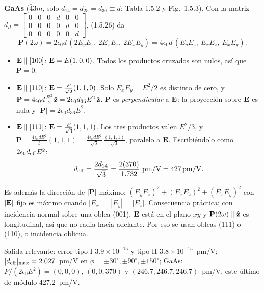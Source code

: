  \textbf{GaAs} ($\bar43m$, solo $d_{14}=d_{25}=d_{36}\equiv d$; Tabla 1.5.2 y Fig.~1.5.3). Con la matriz
$d_{il}=\left[\begin{smallmatrix}0&0&0&d&0&0\\0&0&0&0&d&0\\0&0&0&0&0&d\end{smallmatrix}\right]$, (1.5.26) da
\[
\mathbf P(2\omega)=2\epsilon_0d\,(2E_yE_z,\ 2E_xE_z,\ 2E_xE_y)=4\epsilon_0d\,(E_yE_z,\ E_xE_z,\ E_xE_y).
\]
\begin{itemize}
\item $\mathbf E\parallel[100]$: $\mathbf E=E(1,0,0)$. Todos los productos cruzados son nulos, así que $\mathbf P=0$.
\item $\mathbf E\parallel[110]$: $\mathbf E=\frac{E}{\sqrt2}(1,1,0)$. Solo $E_xE_y=E^2/2$ es distinto de cero, y
$\mathbf P=4\epsilon_0d\frac{E^2}{2}\hat{\mathbf z}=2\epsilon_0d_{36}E^2\,\hat{\mathbf z}$. $\mathbf P$ es \emph{perpendicular} a $\mathbf E$: la proyección sobre $\mathbf E$ es nula y $|\mathbf P|=2\epsilon_0d_{36}E^2$.
\item $\mathbf E\parallel[111]$: $\mathbf E=\frac{E}{\sqrt3}(1,1,1)$. Los tres productos valen $E^2/3$, y
$\mathbf P=\frac{4\epsilon_0dE^2}{3}(1,1,1)=\frac{4\epsilon_0dE^2}{\sqrt3}\,\frac{(1,1,1)}{\sqrt3}$, paralelo a $\mathbf E$. Escribiéndolo como $2\epsilon_0d_{\rm eff}E^2$:
\[
d_{\rm eff}=\frac{2d_{14}}{\sqrt3}=\frac{2(370)}{1.732}\ \text{pm/V}=\SI{427}{pm/V}.
\]
\end{itemize}
Es además la dirección de $|\mathbf P|$ máximo: $(E_yE_z)^2+(E_xE_z)^2+(E_xE_y)^2$ con $|\mathbf E|$ fijo es máximo cuando $|E_x|=|E_y|=|E_z|$.
Consecuencia práctica: con incidencia normal sobre una oblea (001), $\mathbf E$ está en el plano $xy$ y $\mathbf P(2\omega)\parallel\hat{\mathbf z}$ es longitudinal, así que no radia
hacia adelante. Por eso se usan obleas (111) o (110), o incidencia oblicua.

Salida relevante: error tipo I $3.9\times10^{-15}$ y tipo II $3.8\times10^{-15}$~pm/V; $|d_{\rm eff}|_{\max}=2.027$~pm/V en $\phi=\pm30^\circ,\pm90^\circ,\pm150^\circ$;
GaAs: $P/(2\epsilon_0E^2)=(0,0,0)$, $(0,0,370)$ y $(246.7,246.7,246.7)$~pm/V, este último de módulo 427.2~pm/V.


